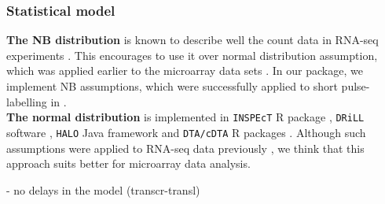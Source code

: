 \subsubsection*{Statistical model}
\textbf{The NB distribution} is known to describe well the count data in RNA-seq 
experiments \citep{robinson2007moderated}. This encourages to use it over 
normal distribution assumption, which was applied earlier to the microarray data sets
\citep{miller2011dynamic}. In our package, we implement NB assumptions, which were
successfully applied to short pulse-labelling in \citep{eser2016determinants,
schwalb2016tt}.\\
\textbf{The normal distribution} is implemented in \verb|INSPEcT| R package \citep{de2015inspect},
\verb|DRiLL| software \citep{rabani2014high}, \verb|HALO| Java framework \citep{friedel2010halo} and 
\verb|DTA/cDTA| R packages \citep{schwalb2012measurement}. Although such assumptions 
were applied to RNA-seq data previously \citep{}, we think that this approach suits better 
for microarray data analysis.





- no delays in the model (transcr-transl)					